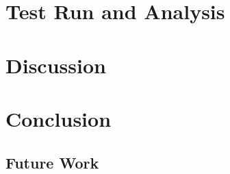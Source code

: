 \section{Test Run and Analysis}

\section{Discussion}

\section{Conclusion}

\subsection{Future Work}

